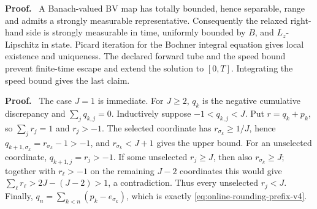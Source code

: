 \documentclass[twoside,11pt]{article}
\renewenvironment{proof}[1][Proof]{\par\noindent\textbf{#1.}\ }{\hfill\BlackBox\par\medskip}
\newcommand{\one}{\mathbf{1}}
\begin{document}
\begin{proof}
A Banach-valued BV map has totally bounded, hence separable, range and admits
a strongly measurable representative.  Consequently the relaxed right-hand
side is strongly measurable in time, uniformly bounded by $B$, and
$L_z$-Lipschitz in state.  Picard iteration for the Bochner integral equation
gives local existence and uniqueness.  The declared forward tube and the speed
bound prevent finite-time escape and extend the solution to $[0,T]$.  Integrating the
speed bound gives the last claim.
\end{proof}


\begin{proof}
The case $J=1$ is immediate.  For $J\ge2$, $q_k$ is the negative cumulative
discrepancy and $\sum_jq_{k,j}=0$.  Inductively suppose
$-1<q_{k,j}<J$.  Put $r=q_k+p_k$, so $\sum_jr_j=1$ and $r_j>-1$.
The selected coordinate has $r_{\sigma_k}\ge1/J$, hence
$q_{k+1,\sigma_k}=r_{\sigma_k}-1>-1$, and
$r_{\sigma_k}<J+1$ gives the upper bound.  For an unselected coordinate,
$q_{k+1,j}=r_j>-1$.  If some unselected $r_j\ge J$, then also
$r_{\sigma_k}\ge J$; together with $r_\ell>-1$ on the remaining $J-2$
coordinates this would give
$\sum_\ell r_\ell>2J-(J-2)>1$, a contradiction.  Thus every unselected
$r_j<J$.  Finally,
$q_n=\sum_{k<n}(p_k-e_{\sigma_k})$, which is exactly
\eqref{eq:online-rounding-prefix-v4}.
\end{proof}
\end{document}
